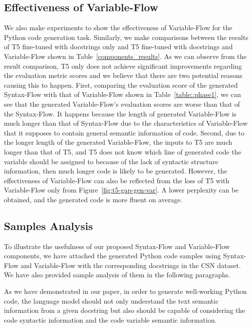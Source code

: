 \documentclass[11pt]{article}
\begin{document}
\subsection{Effectiveness of Variable-Flow}
We also make experiments to show the effectiveness of Variable-Flow for the Python code generation task. Similarly, we make comparisons between the results of T5 fine-tuned with docstrings only and T5 fine-tuned with docstrings and Variable-Flow shown in Table~\ref{components_results}. As we can observe from the result comparison, T5 only does not achieve significant improvements regarding the evaluation metric scores and we believe that there are two potential reasons causing this to happen. First, comparing the evaluation score of the generated Syntax-Flow with that of Variable-Flow shown in Table~\ref{table::phase1}, we can see that the generated Variable-Flow's evaluation scores are worse than that of the Syntax-Flow. It happens because the length of generated Variable-Flow is much longer than that of Syntax-Flow due to the characteristics of Variable-Flow that it supposes to contain general semantic information of code. Second, due to the longer length of the generated Variable-Flow, the inputs to T5 are much longer than that of T5, and T5 does not know which line of generated code the variable should be assigned to because of the lack of syntactic structure information, then much longer code is likely to be generated. However, the effectiveness of Variable-Flow can also be reflected from the loss of T5 with Variable-Flow only from Figure~\ref{fig:t5-gap-gen-var}. A lower perplexity can be obtained, and the generated code is more fluent on average.




\subsection{Samples Analysis}
To illustrate the usefulness of our proposed Syntax-Flow and Variable-Flow components, we have attached the generated Python code samples using Syntax-Flow and Variable-Flow with the corresponding docstrings in the CSN dataset. We have also provided sample analysis of them in the following paragraphs. 

As we have demonstrated in our paper, in order to generate well-working Python code, the language model should not only understand the text semantic information from a given docstring but also should be capable of considering the code syntactic information and the code variable semantic information. 
 
\end{document}
